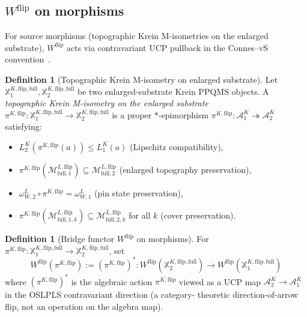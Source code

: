 \documentclass[11pt,a4paper]{article}
\theoremstyle{plain}
\theoremstyle{definition}
\newtheorem{definition}[theorem]{Definition}
\newcommand{\Acal}{\mathcal{A}}
\newcommand{\Mcal}{\mathcal{M}}
\newcommand{\Wflip}{W^{\mathrm{flip}}}
\newcommand{\osXkrein}{\mathbb{X}^{K,\mathrm{flip},\mathrm{full}}}
\begin{document}
\subsection{$\Wflip$ on morphisms}\label{sec:Wflip_morphisms}

For source morphisms (topographic Krein M-isometries on the enlarged
substrate), $\Wflip$ acts via contravariant UCP pullback in the
Connes--vS convention~\cite{connes_vs2021}.

\begin{definition}[Topographic Krein M-isometry on enlarged substrate]
\label{def:source_morphism}
Let $\osXkrein_{1},\osXkrein_{2}$ be two enlarged-substrate Krein
PPQMS objects. A \emph{topographic Krein M-isometry on the enlarged
substrate} $\pi^{K,\mathrm{flip}}:\osXkrein_{1}\to\osXkrein_{2}$ is
a proper $*$-epimorphism
$\pi^{K,\mathrm{flip}}:\Acal^{K}_{1}\twoheadrightarrow\Acal^{K}_{2}$
satisfying:
\begin{itemize}
\item[(S1)] $L^{K}_{2}(\pi^{K,\mathrm{flip}}(a))\le L^{K}_{1}(a)$
(Lipschitz compatibility),
\item[(S2)] $\pi^{K,\mathrm{flip}}(\Mcal^{L,\mathrm{flip}}_{\mathrm{full},1})\subseteq
\Mcal^{L,\mathrm{flip}}_{\mathrm{full},2}$ (enlarged topography preservation),
\item[(S3)] $\omega_{W,2}^{L}\circ\pi^{K,\mathrm{flip}}=\omega_{W,1}^{L}$
(pin state preservation),
\item[(S4)] $\pi^{K,\mathrm{flip}}(\Mcal^{L,\mathrm{flip}}_{\mathrm{full},1,k})
\subseteq\Mcal^{L,\mathrm{flip}}_{\mathrm{full},2,k}$ for all $k$
(cover preservation).
\end{itemize}
\end{definition}

\begin{definition}[Bridge functor $\Wflip$ on morphisms]
\label{def:Wflip_morphisms}
For $\pi^{K,\mathrm{flip}}:\osXkrein_{1}\to\osXkrein_{2}$, set
\begin{equation}
  \Wflip(\pi^{K,\mathrm{flip}}) := (\pi^{K,\mathrm{flip}})^{*}: \Wflip(\osXkrein_{2})\to\Wflip(\osXkrein_{1})
  \label{eq:Wflip_morphisms}
\end{equation}
where $(\pi^{K,\mathrm{flip}})^{*}$ is the algebraic action
$\pi^{K,\mathrm{flip}}$ viewed as a UCP map $\Acal^{K}_{2}\to
\Acal^{K}_{1}$ in the OSLPLS contravariant direction (a category-
theoretic direction-of-arrow flip, not an operation on the algebra
map).
\end{definition}
\end{document}
